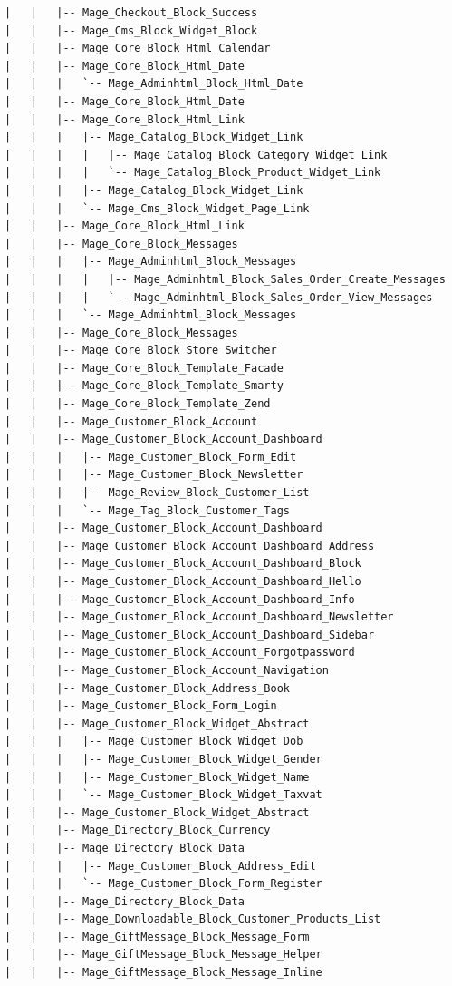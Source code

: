 \documentclass[oneside]{book}
\begin{document}
\begin{lstlisting}
|   |   |-- Mage_Checkout_Block_Success
|   |   |-- Mage_Cms_Block_Widget_Block
|   |   |-- Mage_Core_Block_Html_Calendar
|   |   |-- Mage_Core_Block_Html_Date
|   |   |   `-- Mage_Adminhtml_Block_Html_Date
|   |   |-- Mage_Core_Block_Html_Date
|   |   |-- Mage_Core_Block_Html_Link
|   |   |   |-- Mage_Catalog_Block_Widget_Link
|   |   |   |   |-- Mage_Catalog_Block_Category_Widget_Link
|   |   |   |   `-- Mage_Catalog_Block_Product_Widget_Link
|   |   |   |-- Mage_Catalog_Block_Widget_Link
|   |   |   `-- Mage_Cms_Block_Widget_Page_Link
|   |   |-- Mage_Core_Block_Html_Link
|   |   |-- Mage_Core_Block_Messages
|   |   |   |-- Mage_Adminhtml_Block_Messages
|   |   |   |   |-- Mage_Adminhtml_Block_Sales_Order_Create_Messages
|   |   |   |   `-- Mage_Adminhtml_Block_Sales_Order_View_Messages
|   |   |   `-- Mage_Adminhtml_Block_Messages
|   |   |-- Mage_Core_Block_Messages
|   |   |-- Mage_Core_Block_Store_Switcher
|   |   |-- Mage_Core_Block_Template_Facade
|   |   |-- Mage_Core_Block_Template_Smarty
|   |   |-- Mage_Core_Block_Template_Zend
|   |   |-- Mage_Customer_Block_Account
|   |   |-- Mage_Customer_Block_Account_Dashboard
|   |   |   |-- Mage_Customer_Block_Form_Edit
|   |   |   |-- Mage_Customer_Block_Newsletter
|   |   |   |-- Mage_Review_Block_Customer_List
|   |   |   `-- Mage_Tag_Block_Customer_Tags
|   |   |-- Mage_Customer_Block_Account_Dashboard
|   |   |-- Mage_Customer_Block_Account_Dashboard_Address
|   |   |-- Mage_Customer_Block_Account_Dashboard_Block
|   |   |-- Mage_Customer_Block_Account_Dashboard_Hello
|   |   |-- Mage_Customer_Block_Account_Dashboard_Info
|   |   |-- Mage_Customer_Block_Account_Dashboard_Newsletter
|   |   |-- Mage_Customer_Block_Account_Dashboard_Sidebar
|   |   |-- Mage_Customer_Block_Account_Forgotpassword
|   |   |-- Mage_Customer_Block_Account_Navigation
|   |   |-- Mage_Customer_Block_Address_Book
|   |   |-- Mage_Customer_Block_Form_Login
|   |   |-- Mage_Customer_Block_Widget_Abstract
|   |   |   |-- Mage_Customer_Block_Widget_Dob
|   |   |   |-- Mage_Customer_Block_Widget_Gender
|   |   |   |-- Mage_Customer_Block_Widget_Name
|   |   |   `-- Mage_Customer_Block_Widget_Taxvat
|   |   |-- Mage_Customer_Block_Widget_Abstract
|   |   |-- Mage_Directory_Block_Currency
|   |   |-- Mage_Directory_Block_Data
|   |   |   |-- Mage_Customer_Block_Address_Edit
|   |   |   `-- Mage_Customer_Block_Form_Register
|   |   |-- Mage_Directory_Block_Data
|   |   |-- Mage_Downloadable_Block_Customer_Products_List
|   |   |-- Mage_GiftMessage_Block_Message_Form
|   |   |-- Mage_GiftMessage_Block_Message_Helper
|   |   |-- Mage_GiftMessage_Block_Message_Inline

\end{lstlisting}
\end{document}

